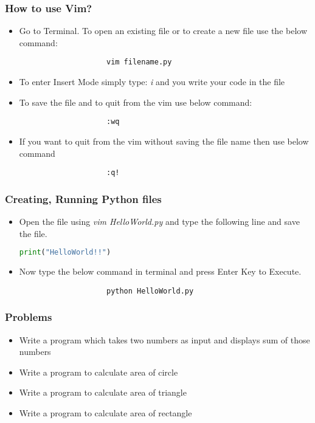\documentclass[14pt]{beamer}
\begin{document}
    \begin{frame}
        \frametitle{How to use Vim?}
        \begin{itemize}
            \item Go to Terminal. To open an existing file or to create a new file use the below command: \\
                \begin{lstlisting}
                    vim filename.py
                \end{lstlisting}
            \item To enter Insert Mode simply type: \emph{i} and you write your code in the file
            \item To save the file and to quit from the vim use below command:
                \begin{lstlisting}
                    :wq
                \end{lstlisting}
            \item If you want to quit from the vim without saving the file name then use below command
                \begin{lstlisting}
                    :q!
                \end{lstlisting}
        \end{itemize}
    \end{frame}
    \begin{frame}
        \frametitle{Creating, Running Python files}
        \begin{itemize}
            \item Open the file using \emph{vim HelloWorld.py} and type the following line and save the file.
                \begin{lstlisting}[language=Python]
                    print("HelloWorld!!")
		        \end{lstlisting}
            \item Now type the below command in terminal and press Enter Key to Execute.
		        \begin{lstlisting}
                    python HelloWorld.py
		        \end{lstlisting}
        \end{itemize}
    \end{frame}
    \begin{frame}
        \frametitle{Problems}
        \begin{itemize}
            \item Write a program which takes two numbers as input and displays sum of those numbers
            \item Write a program to calculate area of circle
            \item Write a program to calculate area of triangle
            \item Write a program to calculate area of rectangle
        \end{itemize}
    \end{frame}
\end{document}
